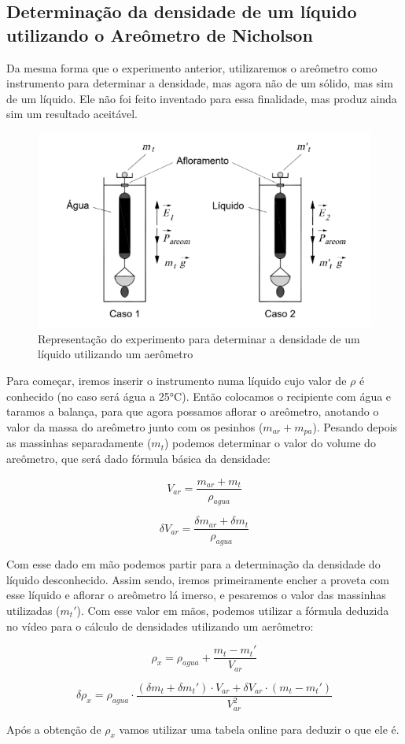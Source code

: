\subsection{Determinação da densidade de um líquido utilizando o
Areômetro de Nicholson}

Da mesma forma que o experimento anterior, utilizaremos o areômetro como instrumento para determinar a densidade, mas agora não de um sólido, mas sim de um líquido. Ele não foi feito inventado para essa finalidade, mas produz ainda sim um resultado aceitável.

\begin{figure}[H]
    \centering
    \includegraphics[scale=0.8]{images/aerometro-densidade-liquido.png}
    \caption{Representação do experimento para determinar a densidade de um líquido utilizando um aerômetro}
\end{figure}

Para começar, iremos inserir o instrumento numa líquido cujo valor de $\rho$ é conhecido (no caso será água a 25°C). Então colocamos o recipiente com água e taramos a balança, para que agora possamos aflorar o areômetro, anotando o valor da massa do areômetro junto com os pesinhos ($m_{ar} + m_{pa}$). Pesando depois as massinhas separadamente ($m_t$) podemos determinar o valor do volume do areômetro, que será dado fórmula básica da densidade:

\[ V_{ar} = \frac{m_{ar} + m_t}{\rho _{agua}} \]

\[ \delta V_{ar} = \frac{\delta m_{ar} + \delta m_t}{\rho _{agua}} \]

Com esse dado em mão podemos partir para a determinação da densidade do líquido desconhecido. Assim sendo, iremos primeiramente encher a proveta com esse líquido e aflorar o areômetro lá imerso, e pesaremos o valor das massinhas utilizadas ($m_t'$). Com esse valor em mãos, podemos utilizar a fórmula deduzida no vídeo para o cálculo de densidades utilizando um aerômetro:

\[ \rho _x = \rho _{agua} + \frac{m_t - m_t'}{V_{ar}} \]

\[ \delta \rho _x = \rho _{agua} \cdot \frac{(\delta m_t + \delta m_t') \cdot V_{ar} + \delta V_{ar} \cdot (m_t - m_t')}{V_{ar}^2} \]

Após a obtenção de $\rho _x$ vamos utilizar uma tabela online para deduzir o que ele é.
